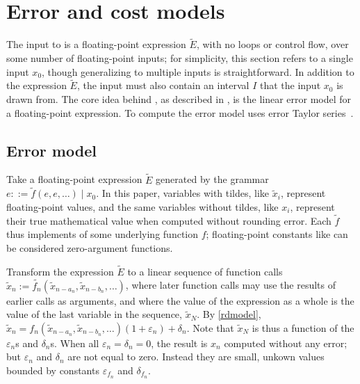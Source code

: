 \documentclass[paper.tex]{subfiles}
\begin{document}
\section{Error and cost models}
\label{sec:error-and-cost-models}

The input to \name is a floating-point expression $\tilde{E}$,
  with no loops or control flow,
  over some number of floating-point inputs;
  for simplicity, this section refers to a single input $x_0$,
  though generalizing to multiple inputs is straightforward.
In addition to the expression $\tilde{E}$,
  the input must also contain an interval $I$
  that the input $x_0$ is drawn from.
The core idea behind \name,
  as described in ,
  is the linear error model for a floating-point expression.
To compute the error model \name uses error Taylor series~\cite{fptaylor}.

\subsection{Error model}

Take a floating-point expression $\tilde{E}$
  generated by the grammar $e ::= \tilde{f}(e, e, \ldots) \mid x_0$.
In this paper, variables with tildes, like $\tilde{x}_i$,
  represent floating-point values,
  and the same variables without tildes, like $x_i$,
  represent their true mathematical value
  when computed without rounding error.
Each $\tilde{f}$ thus implements of some underlying function $f$;
  floating-point constants like 
  can be considered zero-argument functions.

Transform the expression $\tilde{E}$ to a linear sequence of function calls
  $\tilde{x}_n := \tilde{f_n}(\tilde{x}_{n-a_n}, \tilde{x}_{n-b_n}, \ldots)$,
  where later function calls
  may use the results of earlier calls as arguments,
  and where the value of the expression as a whole
  is the value of the last variable in the sequence, $\tilde{x}_N$.
By \cref{rdmodel},
  $\tilde{x}_n = f_n(\tilde{x}_{n-a_n}, \tilde{x}_{n-b_n}, \ldots)(1 + \varepsilon_n) + \delta_n$.
Note that $\tilde{x}_N$ is thus a function of the $\varepsilon_n$s and $\delta_n$s.
When all $\varepsilon_n = \delta_n = 0$,
  the result is $x_n$ computed without any error;
  but $\varepsilon_n$ and $\delta_n$ are not equal to zero.
Instead they are small, unkown values
  bounded by constants $\varepsilon_{f_n}$ and $\delta_{f_n}$.
\end{document}
